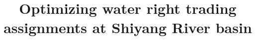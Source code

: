 \documentclass{aamas2015}
\begin{document}
\title{Optimizing water right trading assignments at Shiyang River basin}




%
%
%
%

%

\end{document}
